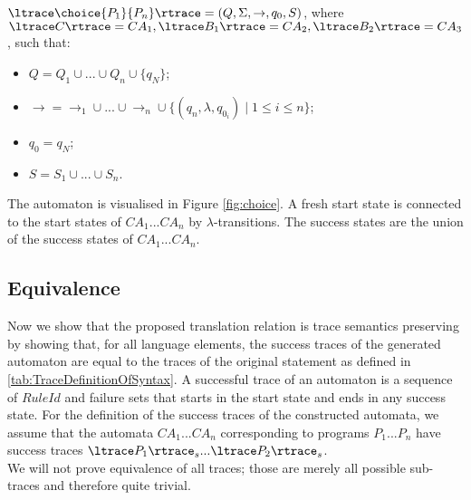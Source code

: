 

\begin{definition}
$\ltrace \choice{P_1}{P_n} \rtrace = (Q,\Sigma,\rightarrow,q_0,S)$, where $\ltrace C \rtrace = CA_1, \ltrace B_1 \rtrace = CA_2, \ltrace B_2 \rtrace = CA_3$, such that:
\begin{itemize}
\item $Q = Q_1 \cup ... \cup Q_n \cup \{ q_N \}$;
\item $\rightarrow = \rightarrow_1 \cup ... \cup \rightarrow_n \cup \{   (q_n,\lambda,q_{0_i}) \mid 1 \leq i \leq n  \}$;
\item $q_0 = q_N$;
\item $S = S_1 \cup ... \cup S_n$.
\end{itemize}
\end{definition}

The automaton is visualised in Figure \ref{fig:choice}. A fresh start state is connected to the start states of $CA_1 ... CA_n$ by $\lambda$-transitions. The success states are the union of the success states of $CA_1 ... CA_n$.


\subsection{Equivalence}
Now we show that the proposed translation relation is trace semantics preserving by showing that, for all language elements, the success traces of the generated automaton are equal to the traces of the original statement as defined in \ref{tab:TraceDefinitionOfSyntax}. A successful trace of an automaton is a sequence of $RuleId$ and failure sets that starts in the start state and ends in any success state. For the definition of the success traces of the constructed automata, we assume that the automata $CA_1 ... CA_n$ corresponding to programs $P_1 ... P_n$ have success traces ${\ltrace P_1 \rtrace}_s ... {\ltrace P_2 \rtrace}_s$.\\
We will not prove equivalence of all traces; those are merely all possible sub-traces and therefore quite trivial. 

